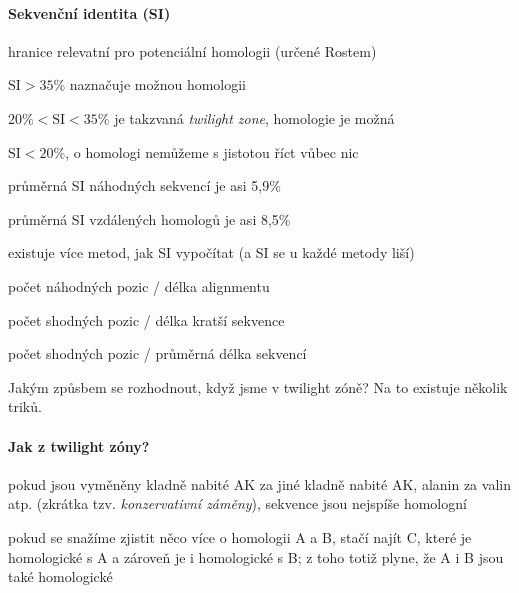 \documentclass[DIV=8]{scrreprt}
\begin{document}
\paragraph{Sekvenční identita (SI)}
\begin{myItemize}[nosep]
    \item hranice relevatní pro potenciální homologii (určené Rostem)
\begin{myItemize}[nosep]
    \item \(\text{SI} > 35\%\) naznačuje možnou homologii
    \item \(20\% < \text{SI} < 35\%\) je takzvaná \emph{twilight zone}, homologie je možná
    \item \(\text{SI} < 20\%\), o homologi nemůžeme s jistotou říct vůbec nic
\end{myItemize}

    \item průměrná SI náhodných sekvencí je asi 5,9\%
    \item průměrná SI vzdálených homologů je asi 8,5\%
    \item existuje více metod, jak SI vypočítat (a SI se u každé metody liší)
\begin{myItemize}[nosep]
    \item počet náhodných pozic / délka alignmentu
    \item počet shodných pozic / délka kratší sekvence
    \item počet shodných pozic / průměrná délka sekvencí
\end{myItemize}

\end{myItemize}



Jakým způsbem se rozhodnout, když jsme v twilight zóně? Na to existuje několik triků.

\paragraph{Jak z twilight zóny?}
\begin{myItemize}[nosep]
    \item pokud jsou vyměněny kladně nabité AK za jiné kladně nabité AK, alanin za valin atp. (zkrátka tzv. \emph{konzervativní záměny}), sekvence jsou nejspíše homologní
    \item pokud se snažíme zjistit něco více o homologii A a B, stačí najít C, které je homologické s A a zároveň je i homologické s B; z toho totiž plyne, že A i B jsou také homologické
\end{myItemize}
\end{document}
